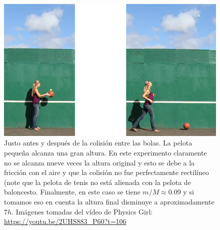 \documentclass[a4paper,11pt]{article}
\begin{document}
\vspace{1cm}

\begin{figure}[H]
	\centering
	\includegraphics[width=\linewidth]{./im/girl1}
	\caption{Justo antes y después de la colisión entre las bolas. La pelota pequeña alcanza una gran altura. En este experimento claramente no se alcanza nueve veces la altura original y esto se debe a la fricción con el aire y que la colisión no fue perfectamente rectilíneo (note que la pelota de tenis no está alienada con la pelota de baloncesto. Finalmente, en este caso se tiene $m/M \approx 0.09$ y si tomamos eso en cuenta la altura final disminuye a aproximadamente $7h$. Imágenes tomadas del vídeo de Physics Girl: \url{https://youtu.be/2UHS883_P60?t=106}}
\end{figure}
\end{document}
